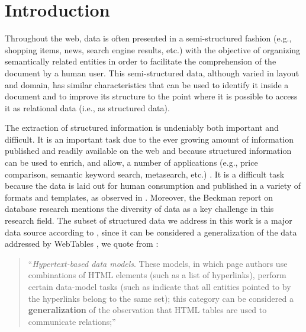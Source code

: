 \vspace{-0.3cm}
\section{Introduction}

Throughout the web, data is often presented in a semi-structured fashion (e.g.,
shopping items, news, search engine results, etc.) with the objective of
organizing semantically related entities in order to facilitate the
comprehension of the document by a human user. This semi-structured data,
although varied in layout and domain, has similar characteristics that can be
used to identify it inside a document and to improve its structure to the point
where it is possible to access it as relational data (i.e., as structured data).

The extraction of structured information is undeniably both important and
difficult. It is an important task due to the ever growing amount of information
published and readily available on the web and because structured information
can be used to enrich, and allow, a number of applications (e.g., price
comparison, semantic keyword search, metasearch, etc.)
\cite{relationalWeb2008,2015webtables}.
It is a difficult task because the data is laid out for human consumption and
published in a variety of formats and templates, as observed in
\cite{structured2011}. Moreover, the Beckman report on database
research\cite{abadi2014beckman} mentions the diversity of data as a key
challenge in this research field. The subset of structured data we address in
this work is a major data source according to \cite{structured2011}, since it
can be considered a generalization of the data addressed by WebTables
\cite{webtables2008}, we quote from \cite{structured2011}:
\begin{quote} 
``\textit{Hypertext-based data models}. These models, in which page authors use
combinations of HTML elements (such as a list of hyperlinks), perform certain 
data-model tasks (such as indicate that all entities pointed to by the
hyperlinks belong to the same set); this category can be considered a
\textbf{generalization} of the observation that HTML tables are used to
communicate relations;''
\end{quote}

